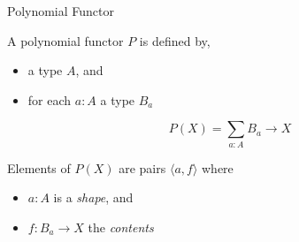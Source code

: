 \documentclass[t,12pt]{beamer}
\begin{document}







    






\begin{frame}{Polynomial Functor}

    \vfill

    A polynomial functor $P$ is defined by,
    \begin{itemize}
        \item a type $A$, and
        \item for each $a : A$ a type $B_{a}$
    \end{itemize}

    \vfill

    \[
        P(X) = \sum_{a : A} B_a → X
    \]

    \vfill

    Elements of $P(X)$ are pairs $⟨a,f⟩$ where
    \begin{itemize}
        \item $a : A$ is a \emph{shape}, and
        \item $f : B_a → X$ the \emph{contents}
    \end{itemize}


    \vfill
    
\end{frame}
\end{document}
